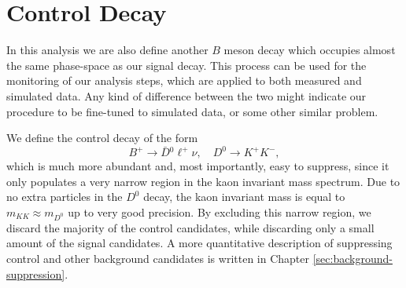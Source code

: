 \newpage
\section{Control Decay}\label{sec:control-decay}

In this analysis we are also define another $B$ meson decay which occupies almost the same phase-space as our signal decay. This process can be used for the monitoring of our analysis steps, which are applied to both measured and simulated data. Any kind of difference between the two might indicate our procedure to be fine-tuned to simulated data, or some other similar problem. 

We define the control decay of the form $$B^+ \to \bar D {}^0 \ell^+ \nu, \quad D^0 \to K^+ K^-,$$ which is much more abundant and, most importantly, easy to suppress, since it only populates a very narrow region in the kaon invariant mass spectrum. Due to no extra particles in the $D^0$ decay, the kaon invariant mass is equal to $m_{KK} \approx m_{D^0}$ up to very good precision. By excluding this narrow region, we discard the majority of the control candidates, while discarding only a small amount of the signal candidates. A more quantitative description of suppressing control and other background candidates is written in Chapter \ref{sec:background-suppression}.